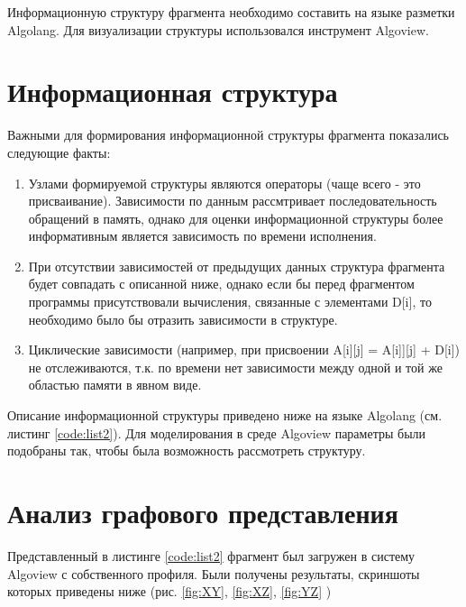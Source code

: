 \documentclass[12pt, fleqn]{article}
\theoremstyle{definition}
\begin{document}
Информационную структуру фрагмента необходимо составить на языке разметки Algolang. Для визуализации структуры использовался инструмент Algoview. 
\section{Информационная структура}
Важными для формирования информационной структуры фрагмента показались следующие факты:
\begin{enumerate}
 \item Узлами формируемой структуры являются операторы (чаще всего - это присваивание). Зависимости по данным рассмтривает последовательность обращений в память, однако для оценки информационной структуры более информативным является зависимость по времени исполнения.
 \item При отсутствии зависимостей от предыдущих данных структура фрагмента будет совпадать с описанной ниже, однако если бы перед фрагментом программы присутствовали вычисления, связанные с элементами D[i], то необходимо было бы отразить зависимости в структуре.
 \item Циклические зависимости (например, при присвоении A[i][j] = A[i]][j] + D[i]) не отслеживаются, т.к. по времени нет зависимости между одной и той же областью памяти в явном виде.
\end{enumerate}


Описание информационной структуры приведено ниже на языке Algolang (см. листинг \ref{code:list2}). Для моделирования в среде Algoview параметры были подобраны так, чтобы была возможность рассмотреть структуру.
{}

\section{Анализ графового представления}
Представленный в листинге \ref{code:list2} фрагмент был загружен в систему Algoview с собственного профиля. Были получены результаты, скриншоты которых приведены ниже (рис. \ref{fig:XY}, \ref{fig:XZ}, \ref{fig:YZ}  )
\end{document}
